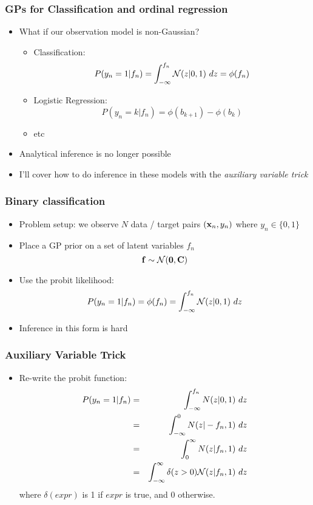 
\begin{frame}
	\frametitle{GPs for Classification and ordinal regression}
	\begin{itemize}
		\item What if our observation model is non-Gaussian?
		\begin{itemize}
			\item Classification:
			\[
				P(y_n=1|f_n) = \int_{-\infty}^{f_n} {\cal N}(z|0,1)~dz = \phi(f_n)
			\]
			\item Logistic Regression:
			\[	
				P(y_n=k|f_n) = \phi(b_{k+1}) - \phi(b_k)
			\]
			\item etc
		\end{itemize}
		\item Analytical inference is no longer possible
		\item I'll cover how to do inference in these models with the \emph{auxiliary variable trick}
	\end{itemize}
\end{frame}

\begin{frame}
	\frametitle{Binary classification}
	\begin{itemize}
		\item Problem setup: we observe $N$ data / target pairs $(\mathbf{x}_n,y_n)$ where $y_n\in \{0,1\}$
		\item Place a GP prior on a set of latent variables $f_n$
		\[
			\mathbf{f} \sim {\cal N}(\mathbf{0},\mathbf{C})
		\]
		\item Use the probit likelihood:
		\[
			P(y_n=1|f_n) = \phi(f_n) = \int_{-\infty}^{f_n} {\cal N}(z|0,1)~dz
		\]
		\item Inference in this form is hard
	\end{itemize}
\end{frame}

\begin{frame}
	\frametitle{Auxiliary Variable Trick}
	\begin{itemize}
		\item Re-write the probit function:
		\begin{eqnarray}
			\nonumber P(y_n=1|f_n) &=& \int_{-\infty}^{f_n} N(z|0,1)~dz\\
			\nonumber & =& \int_{-\infty}^{0} N(z|-f_n,1)~dz\\
			\nonumber &=& \int_{0}^{\infty} N(z|f_n,1)~dz \\
			\nonumber &=& \int_{-\infty}^{\infty} \delta(z>0){\cal N}(z|f_n,1)~dz
		\end{eqnarray}
		where $\delta(expr)$ is 1 if $expr$ is true, and 0 otherwise.
	\end{itemize}
\end{frame}

